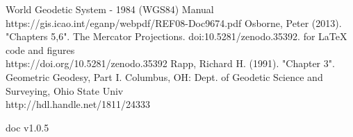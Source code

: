 \documentclass[conference]{IEEEtran}
\begin{document}
\begin{thebibliography}{1}
  World Geodetic System - 1984 (WGS84) Manual\\
https://gis.icao.int/eganp/webpdf/REF08-Doc9674.pdf
 Osborne, Peter (2013). "Chapters 5,6". The Mercator Projections. doi:10.5281/zenodo.35392. for LaTeX code and figures \\
https://doi.org/10.5281/zenodo.35392
 Rapp, Richard H. (1991). "Chapter 3". Geometric Geodesy, Part I. Columbus, OH: Dept. of Geodetic Science and Surveying, Ohio State Univ \\
http://hdl.handle.net/1811/24333
\end{thebibliography}

\vspace*{\fill}
\hspace*{\fill} doc v1.0.5
\end{document}
